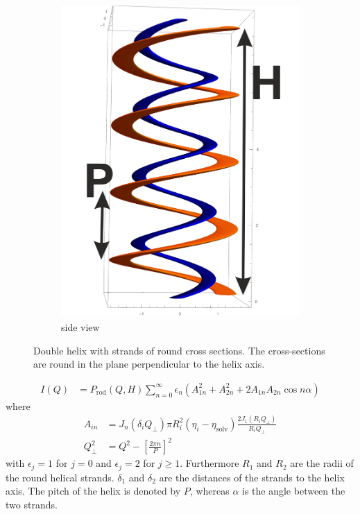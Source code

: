 \begin{figure}[htb]
\begin{subfigure}[b]{.48\textwidth}
   \includegraphics[width=1\textwidth]{../images/form_factor/cylindrical_obj/round_helices3D.png}
   \caption{side view}
   \label{fig:roundhelix2}
\end{subfigure}
\caption{Double helix with strands of round cross sections. The cross-sections are round in the plane perpendicular to the helix axis.} \label{fig:roundhelix}
\end{figure}

\begin{align}
I(Q) &= P_\text{rod}(Q,H) \sum_{n=0}^{\infty} \epsilon_n \left( A_{1n}^2 + A_{2n}^2+2A_{1n}A_{2n}\cos n\alpha\right)
\label{eq:roundhelix1}
\end{align}
where
\begin{align}
A_{in} &= J_n\left(\delta_i Q_\perp\right) \pi R_i^2 \left(\eta_i-\eta_\mathrm{solv}\right)\frac{2J_1\left(R_i Q_\perp\right)}{R_i Q_\perp} \\
Q_\perp^2 &= Q^2-\left[\frac{2\pi n}{P}\right]^2
\end{align}
with $\epsilon_j=1$ for $j=0$ and $\epsilon_j=2$ for $j\geq 1$. Furthermore $R_1$ and $R_2$ are the radii of the round helical strands.
$\delta_1$ and $\delta_2$ are the distances of the strands to the helix axis.
The pitch of the helix is denoted by $P$, whereas $\alpha$ is the angle between the two strands.

